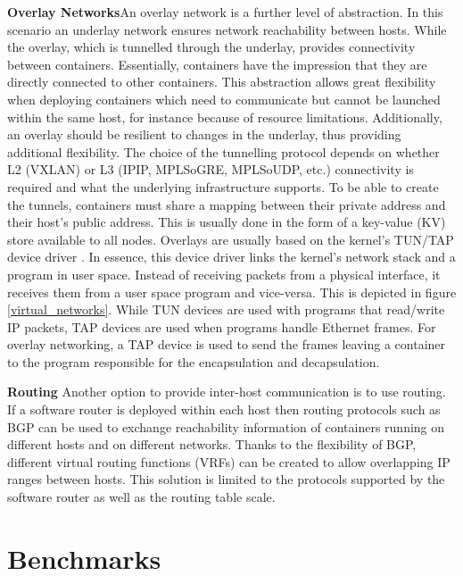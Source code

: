 \documentclass[conference]{IEEEtran}
\begin{document}
\noindent\textbf{Overlay Networks}\hspace{0.2cm}An overlay network is a further level of abstraction. In this scenario an underlay network ensures network reachability between hosts. While the overlay, which is tunnelled through the underlay, provides connectivity between containers. Essentially, containers have the impression that they are directly connected to other containers. This abstraction allows great flexibility when deploying containers which need to communicate but cannot be launched within the same host, for instance because of resource limitations. Additionally, an overlay should be resilient to changes in the underlay, thus providing additional flexibility. The choice of the tunnelling protocol depends on whether L2 (VXLAN) or L3 (IPIP, MPLSoGRE, MPLSoUDP, etc.) connectivity is required and what the underlying infrastructure supports. To be able to create the tunnels, containers must share a mapping between their private address and their host's public address. This is usually done in the form of a key-value (KV) store available to all nodes. Overlays are usually based on the kernel's TUN/TAP device driver \cite{tuntap}. In essence, this device driver links the kernel's network stack and a program in user space. Instead of receiving packets from a physical interface, it receives them from a user space program and vice-versa. This is depicted in figure \ref{virtual_networks}. While TUN devices are used with programs that read/write IP packets, TAP devices are used when programs handle Ethernet frames. For overlay networking, a TAP device is used to send the frames leaving a container to the program responsible for the encapsulation and decapsulation.

\noindent\textbf{Routing}\hspace{0.2cm} Another option to provide inter-host communication is to use routing. If a software router is deployed within each host then routing protocols such as BGP can be used to exchange reachability information of containers running on different hosts and on different networks. Thanks to the flexibility of BGP, different virtual routing functions (VRFs) can be created to allow overlapping IP ranges between hosts. This solution is limited to the protocols supported by the software router as well as the routing table scale.
\section{Benchmarks}
\end{document}
